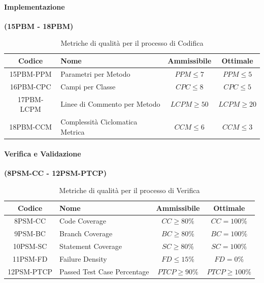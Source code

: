 \documentclass{article}
\begin{document}
\paragraph{Implementazione}%
\textbf{(15PBM - 18PBM)}
\begin{table}[H]
    \centering
    \renewcommand{\arraystretch}{1.5} %
    \begin{tabular}{|c|l|c|c|}
        \hline
        \textbf{Codice} & \textbf{Nome} & \textbf{Ammissibile} & \textbf{Ottimale} \\
        \hline
        15PBM-PPM & Parametri per Metodo & $PPM \leq 7$ & $PPM \leq 5$\\
        16PBM-CPC & Campi per Classe & $CPC \leq 8$ & $CPC \leq 5$ \\
        17PBM-LCPM & Linee di Commento per Metodo & $LCPM \geq 50$ & $LCPM \geq 20$ \\
        18PBM-CCM & Complessità Ciclomatica Metrica & $CCM \leq 6$ & $CCM \leq 3$ \\
        \hline
    \end{tabular}
    \label{tab:codifica}
    \caption{Metriche di qualità per il processo di Codifica}
\end{table}
\paragraph{Verifica e Validazione}%
\textbf{(8PSM-CC - 12PSM-PTCP)}
\begin{table}[H]
    \centering
    \renewcommand{\arraystretch}{1.5} %
    \begin{tabular}{|c|l|c|c|}
        \hline
        \textbf{Codice} & \textbf{Nome} & \textbf{Ammissibile} & \textbf{Ottimale} \\
        \hline
        8PSM-CC & Code Coverage & $CC \geq 80\%$ & $CC = 100\%$ \\
        9PSM-BC & Branch Coverage & $BC \geq 80\%$ & $BC = 100\%$ \\
        10PSM-SC & Statement Coverage & $SC \geq 80\%$ & $SC = 100\%$ \\
        11PSM-FD & Failure Density & $FD \leq 15\%$ & $FD = 0\%$ \\
        12PSM-PTCP & Passed Test Case Percentage & $PTCP \geq 90\%$ & $PTCP \geq 100\%$ \\
        \hline
    \end{tabular}
    \label{tab:verifica}
    \caption{Metriche di qualità per il processo di Verifica}
\end{table}
\end{document}
